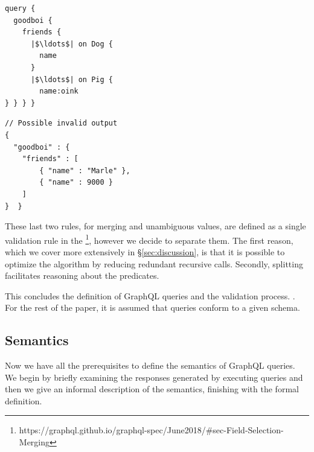 \begin{minipage}[t]{.22\textwidth}
\begin{verbatim}
query {
  goodboi {
    friends {
      |$\ldots$| on Dog {
        name
      }
      |$\ldots$| on Pig {
        name:oink
} } } }
\end{verbatim}
\end{minipage}%
\begin{minipage}[t]{.22\textwidth}
\begin{verbatim}
// Possible invalid output
{
  "goodboi" : {
    "friends" : [
        { "name" : "Marle" },
        { "name" : 9000 }
    ]
}  }
\end{verbatim}
\end{minipage}



				
These last two rules, for merging and unambiguous values, are defined as a single validation rule in the \spec{}\footnote{https://graphql.github.io/graphql-spec/June2018/\#sec-Field-Selection-Merging}, however we decide to separate them. The first reason, which we cover more extensively in \S\ref{sec:discussion}, is that it is possible to optimize the algorithm by reducing redundant recursive calls. Secondly, splitting facilitates reasoning about the predicates.



This concludes the definition of GraphQL queries and the validation process. . For the rest of the paper, it is assumed that queries conform to a given schema. 

\subsection{Semantics}\label{subsec:semantics}
Now we have all the prerequisites to define the semantics of GraphQL queries. We begin by briefly examining the responses generated by executing queries and then we give an informal description of the semantics, finishing with the formal definition. %

